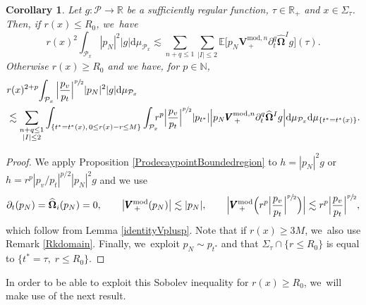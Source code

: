 \documentclass[10pt]{amsart}
\theoremstyle{plain}
\newtheorem{corollary}[proposition]{Corollary}
\theoremstyle{definition}
\newcommand\R{{\mathbb{R}}}
\newcommand\dr{{\mathrm{d}}}
\begin{document}
\begin{corollary}\label{Cordecaypoint}
Let $ g :\mathcal{P} \to \R$ be a sufficiently regular function, $\tau \in \R_+$ and $x \in \Sigma_\tau$. Then, if $r(x) \leq R_0$, we~have
\[
r(x)^2 \int_{\mathcal{P}_x} |p_N|^2 |g| \dr \mu_{\mathcal{P}_x} \lesssim \sum_{n+q \leq 1} \sum_{|I| \leq 2} \mathbb{E} \bigl[p_N \pmb{V}_{\, +}^{ \mathrm{mod},n} \partial_t^q \widehat{\mathbf{\Omega}}^I g \bigr] (\tau).
\]
Otherwise $r(x) \geq R_0$ and we have, for $p \in \mathbb{N}$,
\begin{align*}
& r(x)^{2+p} \! \int_{\mathcal{P}_x} \Big|\frac{p_v}{p_t}\Big|^{\sfrac{p}{2}} |p_N|^2 |g| \dr \mu_{\mathcal{P}_x} \\
	& \lesssim \sum_{\substack{n+q \leq 1 \\ |I| \leq 2}} \int_{\{ t^*=t^*(x), \, 0\leq r(x)-r \leq M \}} \int_{\mathcal{P}_x} \hspace*{-2mm}r^p\Big|\frac{p_v}{p_t}\Big|^{\sfrac{p}{2}} |p_{t^*}| \Big| p_N \pmb{V}_{\, +}^{ \mathrm{mod},n} \partial_t^q \widehat{\mathbf{\Omega}}^I g \Big| \dr \mu_{\mathcal{P}_x} \dr \mu_{\{ t^*=t^*(x)\} }.
\end{align*}
\end{corollary}
\begin{proof}
We apply Proposition \ref{ProdecaypointBoundedregion} to $h=|p_N|^2 g$ or $h=r^p|p_v/p_t|^{p/2}|p_N|^2 g$ and we use
\[ \partial_t(p_N)= \widehat{\mathbf{\Omega}}_i(p_N)=0, \qquad \big|\pmb{V}_{\, +}^{ \mathrm{mod}} (p_N) \big| \lesssim |p_N|, \qquad \Bigl |\pmb{V}_{\, +}^{ \mathrm{mod}} \Bigl(r^p\Big|\frac{p_v}{p_t}\Big|^{\sfrac{p}{2}} \Bigr) \Bigr| \lesssim r^p \Big|\frac{p_v}{p_t}\Big|^{\sfrac{p}{2}},
\]
which follow from Lemma \ref{identityVplusp}. Note that if $r(x) \geq 3M$, we~also use Remark \ref{Rkdomain}. Finally, we~exploit $p_N \sim p_{t^*}$ and that $\Sigma_\tau \cap \{ r \leq R_0 \}$ is equal to $\{ t^* = \tau, \; r \leq R_0 \}$.
\end{proof}

In order to be able to exploit this Sobolev inequality for $r(x) \geq R_0$, we~will make use of the next result.
\end{document}
